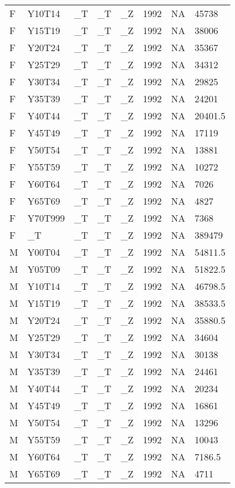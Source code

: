 \begin{longtable}[t]{llllllll}
F & Y10T14 & \_T & \_T & \_Z & 1992 & NA & 45738\\
F & Y15T19 & \_T & \_T & \_Z & 1992 & NA & 38006\\
F & Y20T24 & \_T & \_T & \_Z & 1992 & NA & 35367\\
F & Y25T29 & \_T & \_T & \_Z & 1992 & NA & 34312\\
\addlinespace
F & Y30T34 & \_T & \_T & \_Z & 1992 & NA & 29825\\
F & Y35T39 & \_T & \_T & \_Z & 1992 & NA & 24201\\
F & Y40T44 & \_T & \_T & \_Z & 1992 & NA & 20401.5\\
F & Y45T49 & \_T & \_T & \_Z & 1992 & NA & 17119\\
F & Y50T54 & \_T & \_T & \_Z & 1992 & NA & 13881\\
\addlinespace
F & Y55T59 & \_T & \_T & \_Z & 1992 & NA & 10272\\
F & Y60T64 & \_T & \_T & \_Z & 1992 & NA & 7026\\
F & Y65T69 & \_T & \_T & \_Z & 1992 & NA & 4827\\
F & Y70T999 & \_T & \_T & \_Z & 1992 & NA & 7368\\
F & \_T & \_T & \_T & \_Z & 1992 & NA & 389479\\
\addlinespace
M & Y00T04 & \_T & \_T & \_Z & 1992 & NA & 54811.5\\
M & Y05T09 & \_T & \_T & \_Z & 1992 & NA & 51822.5\\
M & Y10T14 & \_T & \_T & \_Z & 1992 & NA & 46798.5\\
M & Y15T19 & \_T & \_T & \_Z & 1992 & NA & 38533.5\\
M & Y20T24 & \_T & \_T & \_Z & 1992 & NA & 35880.5\\
\addlinespace
M & Y25T29 & \_T & \_T & \_Z & 1992 & NA & 34604\\
M & Y30T34 & \_T & \_T & \_Z & 1992 & NA & 30138\\
M & Y35T39 & \_T & \_T & \_Z & 1992 & NA & 24461\\
M & Y40T44 & \_T & \_T & \_Z & 1992 & NA & 20234\\
M & Y45T49 & \_T & \_T & \_Z & 1992 & NA & 16861\\
\addlinespace
M & Y50T54 & \_T & \_T & \_Z & 1992 & NA & 13296\\
M & Y55T59 & \_T & \_T & \_Z & 1992 & NA & 10043\\
M & Y60T64 & \_T & \_T & \_Z & 1992 & NA & 7186.5\\
M & Y65T69 & \_T & \_T & \_Z & 1992 & NA & 4711\\

\end{longtable}
